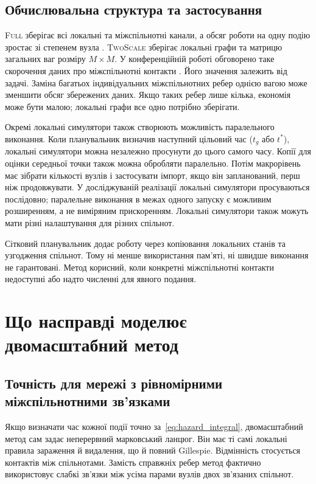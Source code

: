\documentclass[a4paper,fleqn]{cas-sc}
\newcommand{\Full}{\textup{\textsc{Full}}}
\newcommand{\TS}{\textup{\textsc{TwoScale}}}
\begin{document}
\subsection{Обчислювальна структура та застосування}
\label{sec:cost}

\Full{} зберігає всі локальні та міжспільнотні канали, а обсяг роботи на одну подію зростає зі степенем вузла \citep{kuryliak2025simulating}. \TS{} зберігає локальні графи та матрицю загальних ваг розміру $M\times M$. У конференційній роботі обговорено таке скорочення даних про міжспільнотні контакти \citep{kuryliak2025towards}. Його значення залежить від задачі. Заміна багатьох індивідуальних міжспільнотних ребер однією вагою може зменшити обсяг збережених даних. Якщо таких ребер лише кілька, економія може бути малою; локальні графи все одно потрібно зберігати.

Окремі локальні симулятори також створюють можливість паралельного виконання. Коли планувальник визначив наступний цільовий час ($t_g$ або $t^\ast$), локальні симулятори можна незалежно просунути до цього самого часу. Копії для оцінки середньої точки також можна обробляти паралельно. Потім макрорівень має зібрати кількості вузлів і застосувати імпорт, якщо він запланований, перш ніж продовжувати. У досліджуваній реалізації локальні симулятори просуваються послідовно; паралельне виконання в межах одного запуску є можливим розширенням, а не виміряним прискоренням. Локальні симулятори також можуть мати різні налаштування для різних спільнот.

Сітковий планувальник додає роботу через копіювання локальних станів та узгодження спільнот. Тому ні менше використання пам'яті, ні швидше виконання не гарантовані. Метод корисний, коли конкретні міжспільнотні контакти недоступні або надто численні для явного подання.



\section{Що насправді моделює двомасштабний метод}
\label{sec:analysis}

\subsection{Точність для мережі з рівномірними міжспільнотними зв’язками}
\label{sec:surrogate}

Якщо визначати час кожної події точно за~\eqref{eq:hazard_integral}, двомасштабний метод сам задає неперервний марковський ланцюг. Він має ті самі локальні правила зараження й видалення, що й повний Gillespie. Відмінність стосується контактів між спільнотами. Замість справжніх ребер метод фактично використовує слабкі зв'язки між усіма парами вузлів двох зв'язаних спільнот. 
\end{document}
